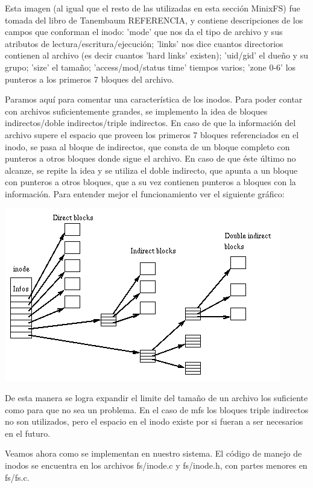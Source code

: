 Esta imagen (al igual que el resto de las utilizadas en esta sección MinixFS)
fue tomada del libro de Tanembaum REFERENCIA, y contiene descripciones de los
campos que conforman el inodo: 'mode' que nos da el tipo de archivo y sus
atributos de lectura/escritura/ejecución; 'links' nos dice cuantos directorios
contienen al archivo (es decir cuantos 'hard links' existen); 'uid/gid' el dueño
y su grupo; 'size' el tamaño; 'access/mod/status time' tiempos varios; 'zone
0-6' los punteros a los primeros 7 bloques del archivo.

Paramos aquí para comentar una característica de los inodos. Para poder contar
con archivos suficientemente grandes, se implemento la idea de bloques
indirectos/doble indirectos/triple indirectos. En caso de que la
información del archivo supere el espacio que proveen los primeros 7 bloques
referenciados en el inodo, se pasa al bloque de indirectos, que consta de un
bloque completo con punteros a otros bloques donde sigue el archivo. En caso de
que éste último no alcanze, se repite la idea y se utiliza el doble indirecto,
que apunta a un bloque con punteros a otros bloques, que a su vez contienen
punteros a bloques con la información. Para entender mejor el funcionamiento ver
el siguiente gráfico:

\begin{center}
\includegraphics[scale=0.5]{../img/inode_links.png}
\end{center}

De esta manera se logra expandir el limite del tamaño de un archivo los
suficiente como para que no sea un problema. En el caso de mfs los bloques
triple indirectos no son utilizados, pero el espacio en el inodo existe por si
fueran a ser necesarios en el futuro.

Veamos ahora como se implementan en nuestro sistema. El código de manejo de
inodos se encuentra en los archivos fs/inode.c y fs/inode.h, con partes menores
en fs/fs.c.

